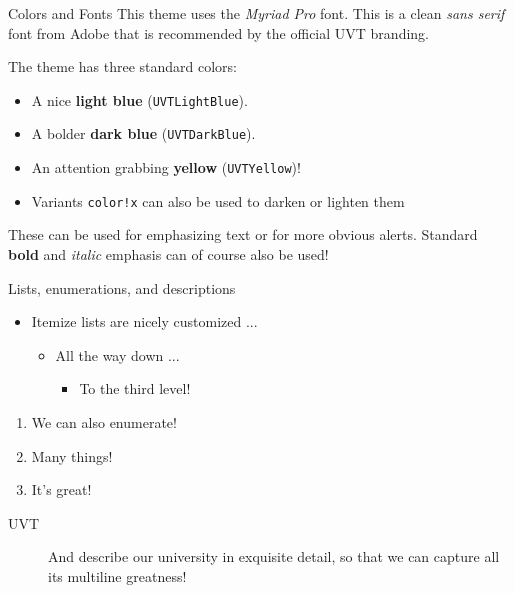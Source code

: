 \documentclass[final]{beamer}
\begin{document}
\begin{frame}[fragile]
\begin{columns}[t]
\begin{column}{0.3\paperwidth}
\begin{block}{Colors and Fonts}
    This theme uses the \emph{Myriad Pro} font. This is a clean \emph{sans serif}
    font from Adobe that is recommended by the official UVT branding.

    \bigskip
    The theme has three standard colors:
    \begin{itemize}
        \item A nice \textcolor{UVTLightBlue}{\textbf{light blue}} (\texttt{UVTLightBlue}).
        \item A bolder \textcolor{UVTDarkBlue}{\textbf{dark blue}} (\texttt{UVTDarkBlue}).
        \item An attention grabbing \textcolor{UVTYellow}{\textbf{yellow}}
        (\texttt{UVTYellow})!
        \item Variants \texttt{color!x} can also be used to darken or lighten them
    \end{itemize}

    \bigskip
    These can be used for emphasizing \textcolor{UVTLightBlue}{text} or for
    more obvious \alert{alerts}. Standard \textbf{bold} and \textit{italic} emphasis
    can of course also be used!
\end{block}

\begin{alertblock}{Lists, enumerations, and descriptions}

\begin{itemize}
    \item Itemize lists are nicely customized ...
    \begin{itemize}
        \item All the way down ...
        \begin{itemize}
            \item To the third level!
        \end{itemize}
    \end{itemize}
\end{itemize}


\begin{enumerate}
    \item We can also enumerate!
    \item Many things!
    \item It's great!
\end{enumerate}


\begin{description}
    \item[UVT] And describe our university in exquisite detail, so that we
        can capture all its multiline greatness!
\end{description}
\end{alertblock}
\end{column}


\end{columns}
\end{frame}
\end{document}
